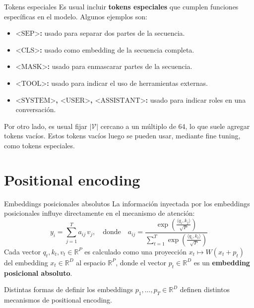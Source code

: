 \documentclass{beamer}
\newcommand{\R}{\mathbb{R}}
\begin{document}
\begin{frame}{Tokens especiales}
    Es usual incluir \textbf{tokens especiales} que cumplen funciones específicas en el modelo. Algunos ejemplos son:
    \begin{itemize}
        \item \textbf{$\text{<SEP>}$:} usado para separar dos partes de la secuencia.
        \item \textbf{$\text{<CLS>}$:} usado como embedding de la secuencia completa.
        \item \textbf{$\text{<MASK>}$:} usado para enmascarar partes de la secuencia.
        \item \textbf{$\text{<TOOL>}$:} usado para indicar el uso de herramientas externas.
        \item \textbf{$\text{<SYSTEM>}$, $\text{<USER>}$, $\text{<ASSISTANT>}$:} usado para indicar roles en una conversación.
    \end{itemize}
    Por otro lado, es usual fijar $|\mathcal{V}|$ cercano a un múltiplo de 64, lo que suele agregar tokens vacíos. Estos tokens vacíos luego se pueden usar, mediante fine tuning, como tokens especiales.
\end{frame}

\section{Positional encoding}

\begin{frame}{Embeddings posicionales absolutos}
    La información inyectada por los embeddings posicionales influye directamente en el mecanismo de atención:
    \begin{equation*}
        y_i=\sum_{j=1}^T a_{ij}\,v_j,
        \quad\text{donde}\quad
        a_{ij}= \frac{\exp\left(\frac{\langle q_i,k_j\rangle}{\sqrt{P}}\right)}{\sum_{t=1}^T \exp\left(\frac{\langle q_i,k_t\rangle}{\sqrt{P}}\right)}
    \end{equation*}
    Cada vector $q_t,k_t,v_t\in\R^P$ es calculado como una proyección $x_t\mapsto W(x_t+p_t)$ del embedding $x_t\in\R^D$ al espacio $\R^P$, donde el vector $p_t\in\R^D$ es un \textbf{embedding posicional absoluto}.

    Distintas formas de definir los embeddings $p_1,\ldots,p_T\in\R^D$ definen distintos mecanismos de positional encoding.
\end{frame}
\end{document}
